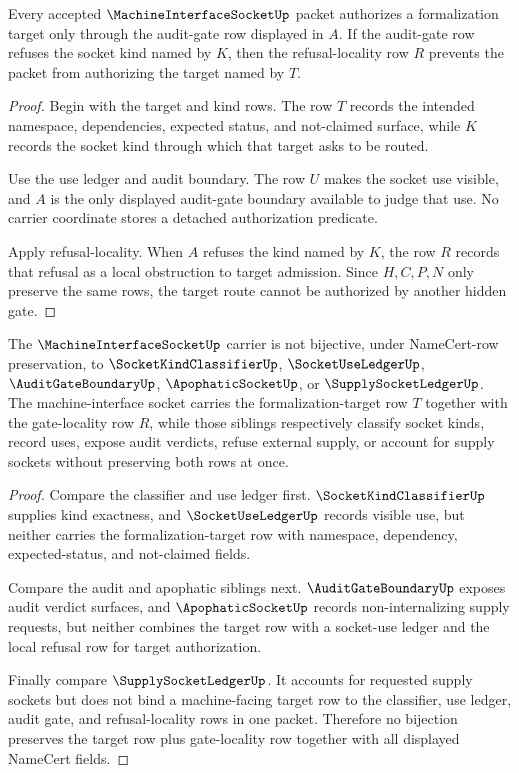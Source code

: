 \begin{theorem}
\label{thm:machine-interface-socket-gate-locality}
Every accepted $\MachineInterfaceSocketUp$ packet authorizes a formalization target only through the audit-gate row displayed in $A$. If the audit-gate row refuses the socket kind named by $K$, then the refusal-locality row $R$ prevents the packet from authorizing the target named by $T$.
\end{theorem}
\begin{proof}
Begin with the target and kind rows. The row $T$ records the intended namespace, dependencies, expected status, and not-claimed surface, while $K$ records the socket kind through which that target asks to be routed.

Use the use ledger and audit boundary. The row $U$ makes the socket use visible, and $A$ is the only displayed audit-gate boundary available to judge that use. No carrier coordinate stores a detached authorization predicate.

Apply refusal-locality. When $A$ refuses the kind named by $K$, the row $R$ records that refusal as a local obstruction to target admission. Since $H,C,P,N$ only preserve the same rows, the target route cannot be authorized by another hidden gate.
\end{proof}

\begin{theorem}
\label{thm:machine-interface-socket-sibling-separation}
The $\MachineInterfaceSocketUp$ carrier is not bijective, under NameCert-row preservation, to $\SocketKindClassifierUp$, $\SocketUseLedgerUp$, $\AuditGateBoundaryUp$, $\ApophaticSocketUp$, or $\SupplySocketLedgerUp$. The machine-interface socket carries the formalization-target row $T$ together with the gate-locality row $R$, while those siblings respectively classify socket kinds, record uses, expose audit verdicts, refuse external supply, or account for supply sockets without preserving both rows at once.
\end{theorem}
\begin{proof}
Compare the classifier and use ledger first. $\SocketKindClassifierUp$ supplies kind exactness, and $\SocketUseLedgerUp$ records visible use, but neither carries the formalization-target row with namespace, dependency, expected-status, and not-claimed fields.

Compare the audit and apophatic siblings next. $\AuditGateBoundaryUp$ exposes audit verdict surfaces, and $\ApophaticSocketUp$ records non-internalizing supply requests, but neither combines the target row with a socket-use ledger and the local refusal row for target authorization.

Finally compare $\SupplySocketLedgerUp$. It accounts for requested supply sockets but does not bind a machine-facing target row to the classifier, use ledger, audit gate, and refusal-locality rows in one packet. Therefore no bijection preserves the target row plus gate-locality row together with all displayed NameCert fields.
\end{proof}

